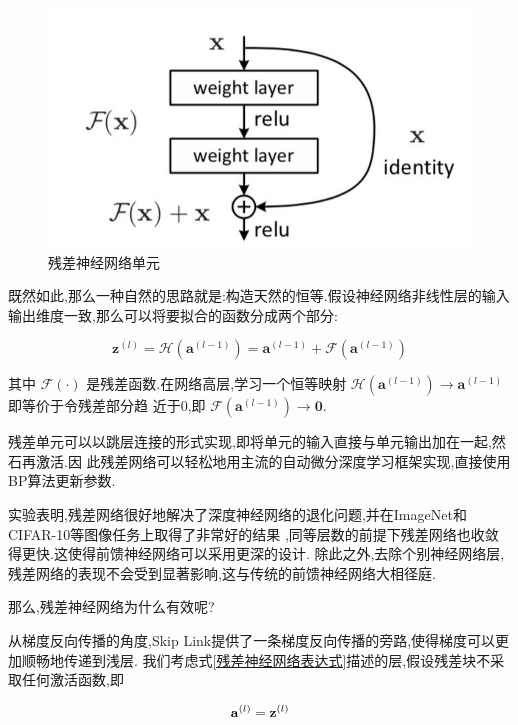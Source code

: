 \begin{figure}
	\includegraphics[scale=0.35]{figures/residual_network.png}
	\caption{残差神经网络单元}
\end{figure}

既然如此,那么一种自然的思路就是:构造天然的恒等.假设神经网络非线性层的输入输出维度一致,那么可以将要拟合的函数分成两个部分:

\begin{equation}
	\mathbf{z}^{(l)}=\mathcal{H}\left(\mathbf{a}^{(l-1)}\right)=\mathbf{a}^{(l-1)}+\mathcal{F}\left(\mathbf{a}^{(l-1)}\right)
	\label{残差神经网络表达式}
\end{equation}

其中 $\mathcal{F}(\cdot)$ 是残差函数.在网络高层,学习一个恒等映射 
$\mathcal{H}\left(\mathbf{a}^{(l-1)}\right) \rightarrow \mathbf{a}^{(l-1)}$ 
即等价于令残差部分趋 近于0,即 $\mathcal{F}\left(\mathbf{a}^{(l-1)}\right) \rightarrow \mathbf{0}$.

残差单元可以以跳层连接的形式实现,即将单元的输入直接与单元输出加在一起,然石再激活.因 
此残差网络可以轻松地用主流的自动微分深度学习框架实现,直接使用BP算法更新参数.

实验表明,残差网络很好地解决了深度神经网络的退化问题,并在ImageNet和CIFAR-10等图像任务上取得了非常好的结果
,同等层数的前提下残差网络也收敛得更快.这使得前馈神经网络可以采用更深的设计.
除此之外,去除个别神经网络层,残差网络的表现不会受到显著影响,这与传统的前馈神经网络大相径庭.

那么,残差神经网络为什么有效呢?

从梯度反向传播的角度,Skip Link提供了一条梯度反向传播的旁路,使得梯度可以更加顺畅地传递到浅层.
我们考虑式\ref{残差神经网络表达式}描述的层,假设残差块不采取任何激活函数,即

\begin{equation}
	\bold{a}^{(l)} = \bold{z}^{(l)}
\end{equation}

